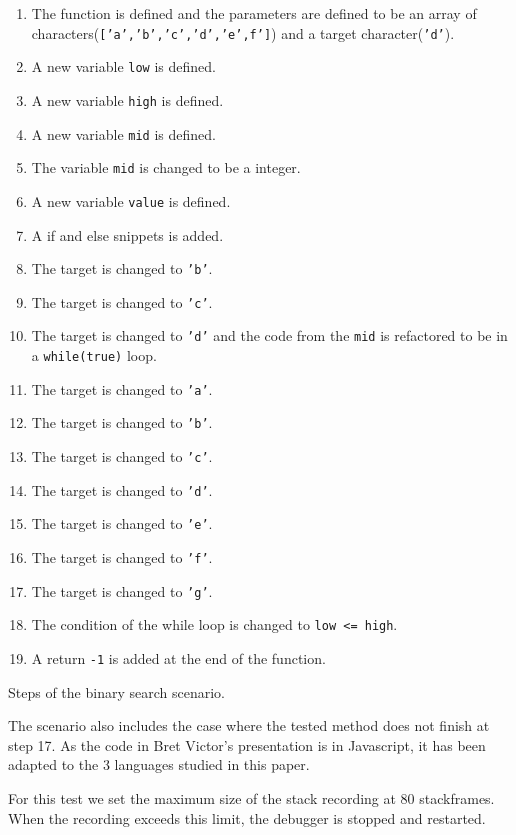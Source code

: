 \documentclass[english,submission]{programming}
\newcommand{\code}[1]{\colorbox{codegray}{\texttt{#1}}}
\begin{document}
\begin{table}
\begin{enumerate}
  \item The function is defined and the parameters are defined to be an array of characters(\code{['a','b','c','d','e',f']}) and a target character(\code{'d'}).
  \item A new variable \code{low} is defined.
  \item A new variable \code{high} is defined.
  \item A new variable \code{mid} is defined.
  \item The variable \code{mid} is changed to be a integer.
  \item A new variable \code{value} is defined.
  \item A if and else snippets is added.
  \item The target is changed to \code{'b'}.
  \item The target is changed to \code{'c'}.
  \item The target is changed to \code{'d'} and the code from the \code{mid} is refactored to be in a \code{while(true)} loop.
  \item The target is changed to \code{'a'}.
  \item The target is changed to \code{'b'}.
  \item The target is changed to \code{'c'}.
  \item The target is changed to \code{'d'}.
  \item The target is changed to \code{'e'}.
  \item The target is changed to \code{'f'}.
  \item The target is changed to \code{'g'}.
  \item The condition of the while loop is changed to \code{low <= high}.
  \item A return \code{-1} is added at the end of the function.
\end{enumerate}
\caption{Steps of the binary search scenario.}
\label{table:scenario-bs}
\end{table}


The scenario also includes the case where the tested method does not finish at step 17. As the code in Bret Victor's presentation is in Javascript, it has been adapted to the 3 languages studied in this paper.

For this test we set the maximum size of the stack recording at 80 stackframes. When the recording exceeds this limit, the debugger is stopped and restarted.
\end{document}
